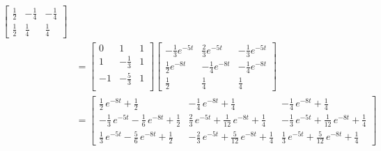 \documentclass[12pt]{gradescopeexam}
\begin{document}
\begin{questions}
\begin{question}
\begin{parts}
\begin{solutionorbox}[7.8in]
\begin{align*}
\begin{bmatrix}
              \frac{1}{2}  &-\frac{1}{4}&-\frac{1}{4}\\
              \frac{1}{2}  &\frac{1}{4} &\frac{1}{4}
            \end{bmatrix}\\
            &=
              \begin{bmatrix}
                0&1&1\\
                1&-\frac{1}{3}&1\\
                -1&-\frac{5}{3}&1\\
              \end{bmatrix}
            \begin{bmatrix}
              -\frac{1}{3}e^{-5t}  &\frac{2}{3}e^{-5t}   & -\frac{1}{3}e^{-5t}\\
              \frac{1}{2}e^{-8t}   &-\frac{1}{4}e^{-8t}  &-\frac{1}{4}e^{-8t} \\
              \frac{1}{2}         &\frac{1}{4}         &\frac{1}{4}
            \end{bmatrix}\\
            &= \begin{bmatrix}
                 \frac{1}{2}\,e^{-8t} + \frac{1}{2} & -\frac{1}{4}\,e^{-8t} + \frac{1}{4} & -\frac{1}{4}\,e^{-8t} + \frac{1}{4}\\
                 -\frac{1}{3}\,e^{-5t} -\frac{1}{6}\,e^{-8t} + \frac{1}{2}  & \frac{2}{3}\,e^{-5t} +\frac{1}{12}\,e^{-8t} + \frac{1}{4}& -\frac{1}{3}\,e^{-5t}       +\frac{1}{12}\,e^{-8t} + \frac{1}{4} \\
                 \frac{1}{3}\,e^{-5t} -\frac{5}{6}\,e^{-8t} + \frac{1}{2}& -\frac{2}{3}\,e^{-5t} + \frac{5}{12}\,e^{-8t} + \frac{1}{4}& \frac{1}{3}\,e^{-5t} + \frac{5}{12}\,e^{-8t}+ \frac{1}{4}
               \end{bmatrix}
          \end{align*}
          
          \end{solutionorbox}

\end{parts}
\end{question}
\end{questions}
\end{document}
